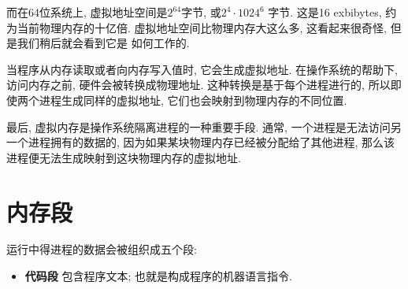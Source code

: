 \documentclass[12pt]{book}
\begin{document}
{%
%
%
而在64位系统上, 虚拟地址空间是$2^{64}$字节, 或$2^4 \cdot 1024^6$ 字节.
这是16 exbibytes, 约为当前物理内存的十亿倍.
虚拟地址空间比物理内存大这么多, 这看起来很奇怪, 但是我们稍后就会看到它是
如何工作的.

当程序从内存读取或者向内存写入值时, 它会生成虚拟地址.
在操作系统的帮助下, 访问内存之前, 硬件会被转换成物理地址.
这种转换是基于每个进程进行的, 所以即使两个进程生成同样的虚拟地址,
它们也会映射到物理内存的不同位置.

最后, 虚拟内存是操作系统隔离进程的一种重要手段.
通常, 一个进程是无法访问另一个进程拥有的数据的, 
因为如果某块物理内存已经被分配给了其他进程,
那么该进程便无法生成映射到这块物理内存的虚拟地址.

\section{内存段}

运行中得进程的数据会被组织成五个段:

\begin{itemize}

\item {\bf 代码段} 包含程序文本; 也就是构成程序的机器语言指令.


\end{itemize}}
\end{document}
